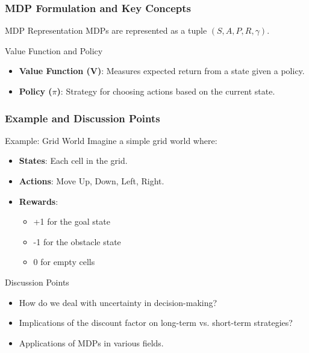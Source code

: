 \documentclass[aspectratio=169]{beamer}
\begin{document}
\begin{frame}[fragile]
    \frametitle{MDP Formulation and Key Concepts}
    
    \begin{block}{MDP Representation}
        MDPs are represented as a tuple \( (S, A, P, R, \gamma) \).
    \end{block}
    
    \begin{block}{Value Function and Policy}
        \begin{itemize}
            \item \textbf{Value Function (V)}: Measures expected return from a state given a policy.
            \item \textbf{Policy ($\pi$)}: Strategy for choosing actions based on the current state.
        \end{itemize}
    \end{block}
\end{frame}

\begin{frame}[fragile]
    \frametitle{Example and Discussion Points}
    
    \begin{block}{Example: Grid World}
        Imagine a simple grid world where:
        \begin{itemize}
            \item \textbf{States}: Each cell in the grid.
            \item \textbf{Actions}: Move Up, Down, Left, Right.
            \item \textbf{Rewards}: 
                \begin{itemize}
                    \item +1 for the goal state
                    \item -1 for the obstacle state
                    \item 0 for empty cells
                \end{itemize}
        \end{itemize}
    \end{block}

    \begin{block}{Discussion Points}
        \begin{itemize}
            \item How do we deal with uncertainty in decision-making?
            \item Implications of the discount factor on long-term vs. short-term strategies?
            \item Applications of MDPs in various fields.
        \end{itemize}
    \end{block}
\end{frame}
\end{document}
